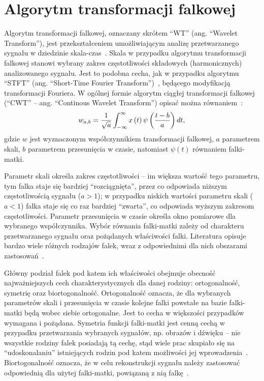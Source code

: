 \chapter{Algorytm transformacji falkowej}

Algorytm transformacji falkowej, oznaczany skrótem \enquote{WT} (ang. \enquote{Wavelet Transform}), jest przekształceniem umożliwiającym analizę przetwarzanego sygnału w dziedzinie skala-czas~\cite{wallen_handbook}. Skala w przypadku algorytmu transformacji falkowej stanowi wybrany zakres częstotliwości składowych (harmonicznych) analizowanego sygnału. Jest to podobna cecha, jak w przypadku algorytmu \enquote{STFT} (ang. \enquote{Short-Time Fourier Transform})~\cite{durak_sftp}, będącego modyfikacją transformacji Fouriera. W ogólnej formie algorytm ciągłej transformacji falkowej (\enquote{CWT} -- ang. \enquote{Continous Wavelet Transform}) opisać można równaniem~\cite{lord_guide, wallen_handbook}:
\begin{equation}
w_{a,b} = \frac{1}{\sqrt{a}} \int _{-\infty} ^{\infty} x \left(t\right) \psi \left(\frac{t-b}{a}\right) dt \label{eq:cwt},
\end{equation}
gdzie $w$ jest wyznaczonym współczynnikiem transformacji falkowej, $a$ parametrem skali, $b$ parametrem przesunięcia w czasie, natomiast $\psi(t)$ równaniem falki-matki.

Parametr skali określa zakres częstotliwości -- im większa wartość tego parametru, tym falka staje się bardziej \enquote{rozciągnięta}, przez co odpowiada niższym częstotliwością sygnału ($a > 1$); w przypadku niskich wartości parametru skali ($a < 1$) falka staje się co raz bardziej \enquote{zwarta}, co odpowiada wyższym zakresom częstotliwości. Parametr przesunięcia w czasie określa okno pomiarowe dla wybranego współczynnika. Wybór równania falki-matki zależy od charakteru przetwarzanego sygnału oraz pożądanych właściwości falki. Literatura opisuje bardzo wiele różnych rodzajów falek, wraz z odpowiednimi dla nich obszarami zastosowań~\cite{wallen_handbook, akujuobi_applications}.

Główny podział falek pod katem ich właściwości obejmuje obecność najważniejszych cech charakterystycznych dla danej rodziny: ortogonalność, symetrię oraz biortogonalność. Ortogonalność oznacza, że dla wybranych parametrów skali i przesunięcia w czasie kolejne falki powstałe na bazie falki-matki będą wobec siebie ortogonalne. Jest to cecha w większości przypadków wymagana i pożądana. Symetria funkcji falki-matki jest cenną cechą w przypadku przetwarzania wybranych sygnałów, np. obrazów i dźwięku -- nie wszystkie rodziny falek posiadają tą cechę, stąd wiele prac skupiało się na \enquote{udoskonalaniu} istniejących rodzin pod katem możliwości jej wprowadzenia~\cite{reddy_compression}. Biortogonalność oznacza, że w celu rekonstrukcji sygnału należy zastosować odpowiednią dla użytej falki-matki, powiązaną z nią falkę~\cite{sweldens_bior}.

